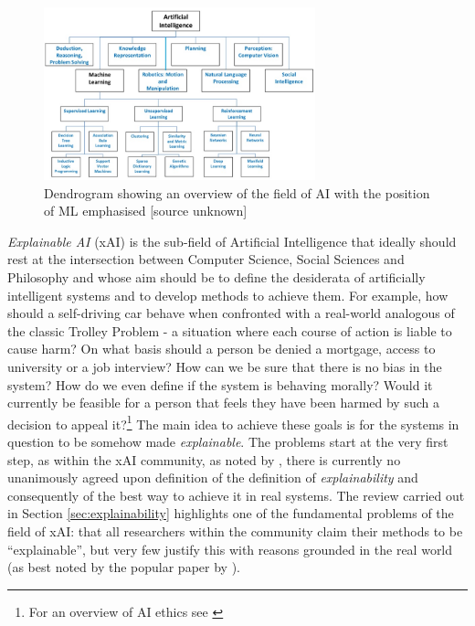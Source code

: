  \begin{figure}[htbp]
\centerline{\includegraphics[width=0.7\textwidth]{introduction/images/ai-overview}}
\caption{Dendrogram showing an overview of the field of AI with the position of ML emphasised [source unknown]}
\label{fig:ai-overview}
\end{figure}

\textit{Explainable AI} (xAI) is the sub-field of Artificial Intelligence that ideally should rest at the intersection between Computer Science, Social Sciences and Philosophy and whose aim should be to define the desiderata of artificially intelligent systems and to develop methods to achieve them.
For example, how should a self-driving car behave when confronted with a real-world analogous of the classic Trolley Problem - a situation where each course of action is liable to cause harm?  
On what basis should a person be denied a mortgage, access to university or a job interview?  How can we be sure that there is no bias in the system?  How do we even define if the system is behaving morally?  Would it currently be feasible for a person that feels they have been harmed by such a decision to appeal it?\footnote{For an overview of AI ethics see \citet{Bostrom2011}}
The main idea to achieve these goals is for the systems in question to be somehow made \textit{explainable}. 
The problems start at the very first step, as within the xAI community, as noted by \citet{Doran2018}, there is currently no unanimously agreed upon definition of the definition of \textit{explainability} and consequently of the best way to achieve it in real systems.
The review carried out in Section \ref{sec:explainability} highlights one of the fundamental problems of the field of xAI: that all researchers within the community claim their methods to be \enquote{explainable}, but very few justify this with reasons grounded in the real world (as best noted by the popular paper by \citet{Lipton2016}).

